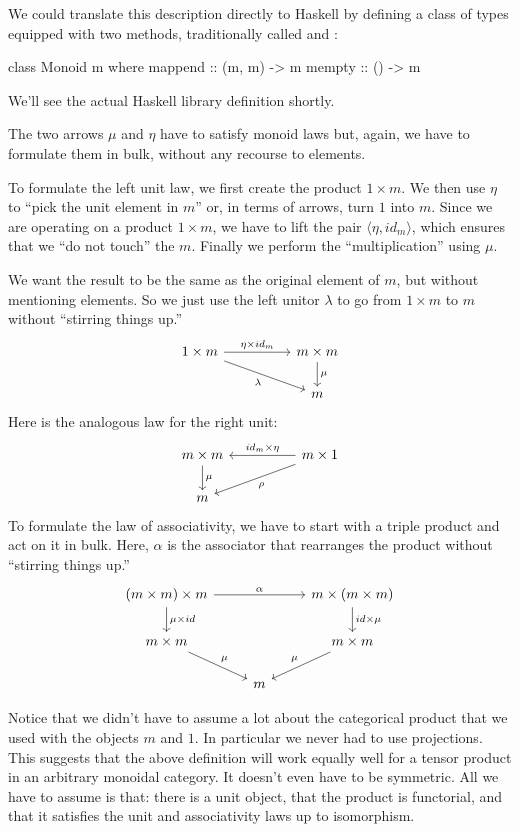 \documentclass[DaoFP]{subfiles}
\begin{document}
We could translate this description directly to Haskell by defining a class of types equipped with two methods, traditionally called  and :
\begin{haskell}
class Monoid m where
  mappend :: (m, m) -> m
  mempty  :: () -> m
\end{haskell}
We'll see the actual Haskell library definition shortly.

The two arrows $\mu$ and $\eta$ have to satisfy monoid laws but, again, we have to formulate them in bulk, without any recourse to elements.

To formulate the left unit law, we first create the product $1 \times m$. We then use $\eta$ to ``pick the unit element in $m$'' or, in terms of arrows, turn $1$ into $m$. Since we are operating on a product $1 \times m$, we have to lift the pair $\langle \eta, id_m \rangle$, which ensures that we ``do not touch'' the $m$. Finally we perform the ``multiplication'' using $\mu$. 

We want the result to be the same as the original element of $m$, but without mentioning elements. So we just use the left unitor $\lambda$ to go from $1 \times m$ to $m$ without ``stirring things up.''
\[
 \begin{tikzcd}
 1 \times m
 \arrow[rr, "\eta \times id_m"]
 \arrow[rrd, "\lambda"']
& & m \times m
 \arrow[d, "\mu"]
 \\
 && m
  \end{tikzcd}
\]
Here is the analogous law for the right unit:
\[
 \begin{tikzcd}
 m \times m
 \arrow[d, "\mu"]
 && m \times 1
 \arrow[ll, "id_m \times \eta"']
 \arrow[lld, "\rho"]
 \\
 m
 \end{tikzcd}
\]
To formulate the law of associativity, we have to start with a triple product and act on it in bulk. Here, $\alpha$ is the associator that rearranges the product without ``stirring things up.''
\[
 \begin{tikzcd}
 (m \times m) \times m 
 \arrow[rr, "\alpha"]
 \arrow[d, "\mu \times id"]
 &&
 m \times (m \times m)
 \arrow[d, "id \times \mu"]
 \\
 m \times m 
 \arrow[dr, "\mu"]
& & m \times m
 \arrow[dl, "\mu"']
 \\
&  m
 \end{tikzcd}
\]

Notice that we didn't have to assume a lot about the categorical product that we used with the objects $m$ and $1$. In particular we never had to use projections. This suggests that the above definition will work equally well for a tensor product in an arbitrary monoidal category. It doesn't even have to be symmetric. All we have to assume is that: there is a unit object, that the product is functorial, and that it satisfies the unit and associativity laws up to isomorphism.
\end{document}
